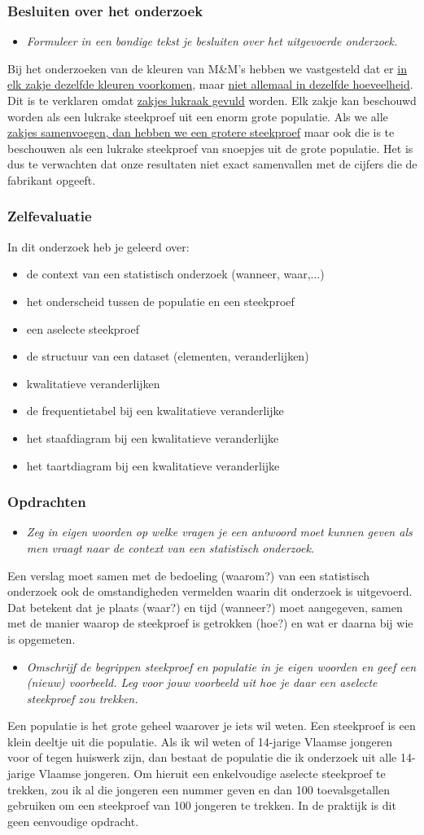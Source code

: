 \documentclass[dutch]{beamer}
\newcommand{\vraag}[1]{\begin{itemize}\item {\it #1}\end{itemize}}
\begin{document}
\begin{frame}
\frametitle{Besluiten over het onderzoek}
\vraag{Formuleer in een bondige tekst je besluiten over het uitgevoerde onderzoek.}
\pause
Bij het onderzoeken van de kleuren van M\&M’s hebben we vastgesteld dat er \uline{in elk zakje
dezelfde kleuren voorkomen}, maar \uline{niet allemaal in dezelfde hoeveelheid}. Dit is te verklaren
omdat \uline{zakjes lukraak gevuld} worden. Elk zakje kan beschouwd worden als een lukrake
steekproef uit een enorm grote populatie. Als we alle \uline{zakjes samenvoegen, dan hebben we
een grotere steekproef} maar ook die is te beschouwen als een lukrake steekproef van snoepjes
uit de grote populatie. Het is dus te verwachten dat onze resultaten niet exact samenvallen
met de cijfers die de fabrikant opgeeft.
\end{frame}

\begin{frame}
\frametitle{Zelfevaluatie}
In dit onderzoek heb je geleerd over:\\
\begin{itemize}
  \item de context van een statistisch onderzoek (wanneer, waar,...)
  \item het onderscheid tussen de populatie en een steekproef
  \item een aselecte steekproef
  \item de structuur van een dataset (elementen, veranderlijken)
  \item kwalitatieve veranderlijken
  \item de frequentietabel bij een kwalitatieve veranderlijke
  \item het staafdiagram bij een kwalitatieve veranderlijke
  \item het taartdiagram bij een kwalitatieve veranderlijke
\end{itemize}
\end{frame}

\begin{frame}
\frametitle{Opdrachten}
\vraag{Zeg in eigen woorden op welke vragen je een antwoord moet kunnen geven als men vraagt
naar de context van een statistisch onderzoek.}
\pause
Een verslag moet samen met de bedoeling (waarom?) van een statistisch onderzoek ook de
omstandigheden vermelden waarin dit onderzoek is uitgevoerd. Dat betekent dat je plaats
(waar?) en tijd (wanneer?) moet aangegeven, samen met de manier waarop de steekproef is
getrokken (hoe?) en wat er daarna bij wie is opgemeten.
\pause
\vraag{Omschrijf de begrippen steekproef en populatie in je eigen woorden en geef een (nieuw)
voorbeeld. Leg voor jouw voorbeeld uit hoe je daar een aselecte steekproef zou
trekken.}
\pause
Een populatie is het grote geheel waarover je iets wil weten. Een steekproef is een klein
deeltje uit die populatie. Als ik wil weten of 14-jarige Vlaamse jongeren voor of tegen
huiswerk zijn, dan bestaat de populatie die ik onderzoek uit alle 14-jarige Vlaamse jongeren.
Om hieruit een enkelvoudige aselecte steekproef te trekken, zou ik al die jongeren een
nummer geven en dan 100 toevalsgetallen gebruiken om een steekproef van 100 jongeren te
trekken. In de praktijk is dit geen eenvoudige opdracht.
\end{frame}
\end{document}
